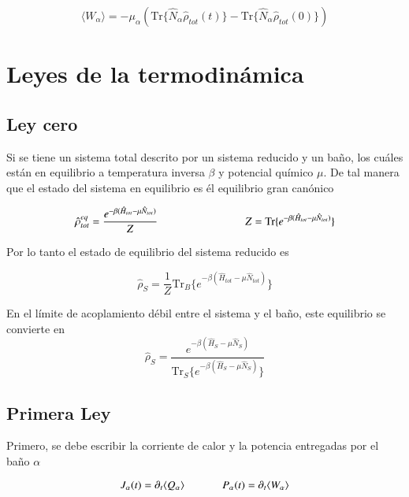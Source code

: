 \begin{equation*}
    \langle W_{\alpha}\rangle = - \mu_{\alpha} (\text{Tr}\{\hat{N}_{\alpha} \hat{\rho}_{tot}(t) \} - \text{Tr}\{\hat{N}_{\alpha}\hat{\rho}_{tot}(0) \}  )
\end{equation*}
\label{sec3workheat}

\newpage

\section{Leyes de la termodinámica}
\subsection{Ley cero}
Si se tiene un sistema total descrito por un sistema reducido y un baño, los cuáles están en equilibrio a temperatura inversa $\beta$ y potencial químico $\mu$. De tal manera que el estado del sistema en equilibrio es él equilibrio gran canónico

\begin{equation*}
    \hat{\rho}^{eq}_{tot} = \frac{e^{-\beta(\hat{H}_{tot} - \mu \hat{N}_{tot})}}{Z}  \hspace{28mm} Z = \text{Tr}\{e^{-\beta(\hat{H}_{tot} - \mu \hat{N}_{tot})} \}
\end{equation*}

Por lo tanto el estado de equilibrio del sistema reducido es

\begin{equation*}
    \hat{\rho}_{S} = \frac{1}{Z}\text{Tr}_{B}\{ e^{-\beta(\hat{H}_{tot} - \mu \hat{N}_{tot})} \}
\end{equation*}

En el límite de acoplamiento débil entre el sistema y el baño, este equilibrio se convierte en \cite{geva2000second}
\begin{equation*}
    \hat{\rho}_{S} = \frac{e^{-\beta(\hat{H}_{S} - \mu\hat{N}_{S})}}{\text{Tr}_{S}\{e^{-\beta(\hat{H}_{S} - \mu \hat{N}_{S})} \} }
\end{equation*}

\subsection{Primera Ley}
Primero, se debe escribir la corriente de calor y la potencia entregadas por el baño $\alpha$

\begin{equation*}
    J_{\alpha}(t) = \partial_{t}\langle Q_{\alpha}\rangle \hspace{12mm}  P_{\alpha}(t) = \partial_{t}\langle W_{\alpha}\rangle
\end{equation*}


